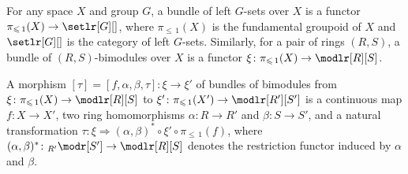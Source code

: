 \documentclass[AHL,Unicode,published]{cedram}
\renewcommand{\leq}{\leqslant}
\begin{document}
\begin{defi}\label{d:bundlesII}
For any space $X$ and group $G$, a bundle of left $G$-sets over $X$ is a functor $\pi_{\leq\,1}(X) \to \setlr[G][]$, where $\pi_{\leq\,1}(X)$ is the fundamental groupoid of $X$ and $\setlr[G][]$ is the category of left $G$-sets. Similarly, for a pair of rings $(R,S)$, a bundle of $(R,S)$-bimodules over $X$ is a functor $\xi \colon \pi_{\leq\,1}(X)\to \modlr[R][S]$.

A morphism $[\tau] = [f,\alpha,\beta,\tau] \colon \xi \to \xi'$ of bundles of bimodules from $\xi\colon \pi_{\leq\,1}(X)\to \modlr[R][S]$ to $\xi'\colon\pi_{\leq\,1}(X')\to \modlr[R'][S']$ is a continuous map $f \colon X \to X'$, two ring homomorphisms $\alpha \colon R \to R'$ and $\beta \colon S \to S'$, and a natural transformation $\tau \colon \xi \Rightarrow (\alpha,\beta)^{*} \circ \xi' \circ \pi_{\leq\,1}(f)$, where $(\alpha,\beta)^{*} \colon {}_{R'}\modr[S'] \to \modlr[R][S]$ denotes the restriction functor induced by $\alpha$ and $\beta$.
\end{defi}
\end{document}
